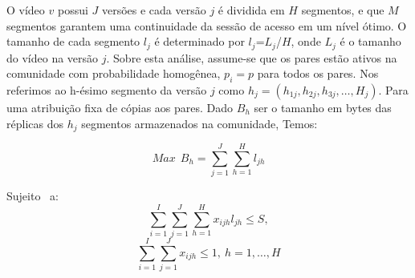 \documentclass[
	12pt,				%
	oneside,			%
	a4paper,			%
	english,			%
	brazil				%
	]{abntex2ppgsi}
\begin{document}





\newcommand{\veth}{$h_{j}=(h_{1j},h_{2j},h_{3j},\ldots,H_j)$}


O vídeo $v$ possui $J$ versões e cada versão $j$ é dividida em $H$ segmentos, e que $M$ segmentos garantem uma continuidade da sessão de acesso em um nível ótimo. O tamanho de cada segmento $l_j$ é determinado por $l_j$=$L_j$/$H$, onde $L_j$ é o tamanho do vídeo na versão $j$.
%
%
%
Sobre esta análise, assume-se que os pares estão ativos na comunidade com probabilidade homogênea, $p_i=p$ para todos os pares.
Nos referimos ao h-ésimo segmento da versão $j$ como \veth. Para uma atribuição fixa de cópias aos pares. Dado $B_h$ ser o tamanho em bytes das réplicas dos $h_j$ segmentos armazenados na comunidade, Temos:

\begin{equation}
Max  \ \ B_h=\sum_{j=1}^{J}\sum_{h=1}^{H}l_{jh}
\end{equation}

Sujeito \ a:
\begin{equation}
\sum_{i=1}^{I}\sum_{j=1}^{J}\sum_{h=1}^{H}x_{ijh}l_{jh} \leq S,
\end{equation}
\begin{equation}
\sum_{i=1}^{I}\sum_{j=1}^{J}x_{ijh} \leq 1 ,\ h = 1, \dots, H
\end{equation}
\end{document}

